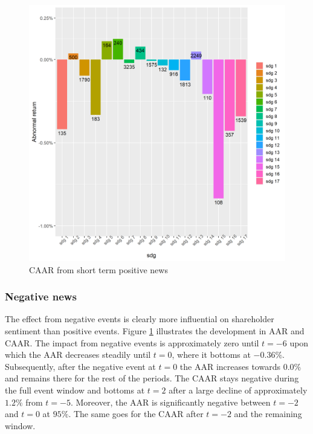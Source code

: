 \begin{figure} [H]
    \centering
    \includegraphics[scale=0.6]{Projekt/1.Figures analysis/ST_positive_sdg_bar.png}
    \caption{CAAR from short term positive news}
    \label{fig:ST_pos_news}
\end{figure}




 \label{ST_tab}

\subsubsection{Negative news}

The effect from negative events is clearly more influential on shareholder sentiment than positive events. Figure \ref{fig:ST_pos_news} illustrates the development in AAR and CAAR.  The impact from negative events is approximately zero until $t = -6$ upon which the AAR decreases steadily until $t=0$, where it bottoms at $-0.36\%$. Subsequently, after the negative event at $t=0$ the AAR increases towards $0.0\%$ and remains there for the rest of the periods. The CAAR stays negative during the full event window and bottoms at $t=2$ after a large decline of approximately $1.2\%$ from  $t=-5$.  
Moreover, the AAR is significantly negative between $t=-2$ and $t=0$ at $95\%$. The same goes for the CAAR after $t=-2$ and the remaining window.  

